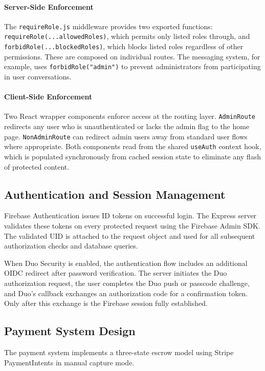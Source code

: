 \documentclass[11pt]{article}
\begin{document}
\paragraph{Server-Side Enforcement}
The \texttt{requireRole.js} middleware provides two exported functions:
\texttt{requireRole(...allowedRoles)}, which permits only listed roles through, and
\texttt{forbidRole(...blockedRoles)}, which blocks listed roles regardless of other
permissions. These are composed on individual routes. The messaging system, for example,
uses \texttt{forbidRole("admin")} to prevent administrators from participating in user
conversations.

\paragraph{Client-Side Enforcement}
Two React wrapper components enforce access at the routing layer. \texttt{AdminRoute}
redirects any user who is unauthenticated or lacks the admin flag to the home page.
\texttt{NonAdminRoute} can redirect admin users away from standard user flows where
appropriate. Both components read from the shared \texttt{useAuth} context hook, which
is populated synchronously from cached session state to eliminate any flash of
protected content.

\subsection{Authentication and Session Management}

Firebase Authentication issues ID tokens on successful login. The Express server
validates these tokens on every protected request using the Firebase Admin SDK. The
validated UID is attached to the request object and used for all subsequent
authorization checks and database queries.

When Duo Security is enabled, the authentication flow includes an additional OIDC
redirect after password verification. The server initiates the Duo authorization
request, the user completes the Duo push or passcode challenge, and Duo's callback
exchanges an authorization code for a confirmation token. Only after this exchange is
the Firebase session fully established.

\subsection{Payment System Design}

The payment system implements a three-state escrow model using Stripe PaymentIntents
in manual capture mode.
\end{document}
